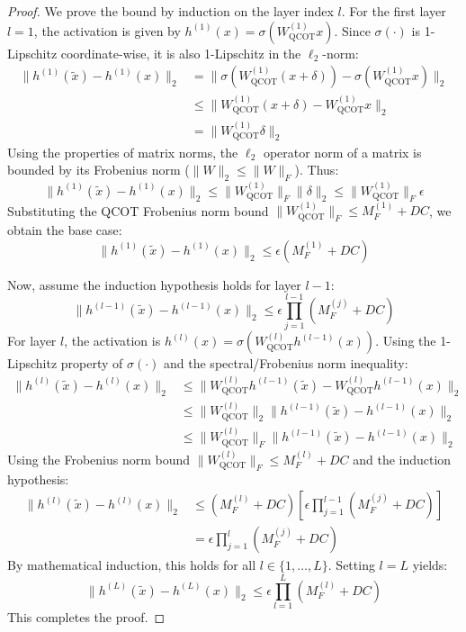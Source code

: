 \documentclass{article}
\theoremstyle{plain}
\theoremstyle{definition}
\theoremstyle{remark}
\begin{document}
\begin{proof}
We prove the bound by induction on the layer index $l$.
For the first layer $l = 1$, the activation is given by $h^{(1)}(x) = \sigma(W_{\text{QCOT}}^{(1)} x)$. Since $\sigma(\cdot)$ is 1-Lipschitz coordinate-wise, it is also 1-Lipschitz in the $\ell_2$-norm:
\begin{align}
    \|h^{(1)}(\tilde{x}) - h^{(1)}(x)\|_2 &= \|\sigma(W_{\text{QCOT}}^{(1)} (x + \delta)) - \sigma(W_{\text{QCOT}}^{(1)} x)\|_2 \nonumber \\
    &\le \|W_{\text{QCOT}}^{(1)} (x + \delta) - W_{\text{QCOT}}^{(1)} x\|_2 \nonumber \\
    &= \|W_{\text{QCOT}}^{(1)} \delta\|_2
\end{align}
Using the properties of matrix norms, the $\ell_2$ operator norm of a matrix is bounded by its Frobenius norm ($\|W\|_2 \le \|W\|_F$). Thus:
\begin{equation}
    \|h^{(1)}(\tilde{x}) - h^{(1)}(x)\|_2 \le \|W_{\text{QCOT}}^{(1)}\|_F \|\delta\|_2 \le \|W_{\text{QCOT}}^{(1)}\|_F \epsilon
\end{equation}
Substituting the QCOT Frobenius norm bound $\|W_{\text{QCOT}}^{(1)}\|_F \le M_F^{(1)} + D C$, we obtain the base case:
\begin{equation}
    \|h^{(1)}(\tilde{x}) - h^{(1)}(x)\|_2 \le \epsilon \left( M_F^{(1)} + D C \right)
\end{equation}

Now, assume the induction hypothesis holds for layer $l-1$:
\begin{equation}
    \|h^{(l-1)}(\tilde{x}) - h^{(l-1)}(x)\|_2 \le \epsilon \prod_{j=1}^{l-1} \left( M_F^{(j)} + D C \right)
\end{equation}
For layer $l$, the activation is $h^{(l)}(x) = \sigma(W_{\text{QCOT}}^{(l)} h^{(l-1)}(x))$. Using the 1-Lipschitz property of $\sigma(\cdot)$ and the spectral/Frobenius norm inequality:
\begin{align}
    \|h^{(l)}(\tilde{x}) - h^{(l)}(x)\|_2 &\le \|W_{\text{QCOT}}^{(l)} h^{(l-1)}(\tilde{x}) - W_{\text{QCOT}}^{(l)} h^{(l-1)}(x)\|_2 \nonumber \\
    &\le \|W_{\text{QCOT}}^{(l)}\|_2 \|h^{(l-1)}(\tilde{x}) - h^{(l-1)}(x)\|_2 \nonumber \\
    &\le \|W_{\text{QCOT}}^{(l)}\|_F \|h^{(l-1)}(\tilde{x}) - h^{(l-1)}(x)\|_2
\end{align}
Using the Frobenius norm bound $\|W_{\text{QCOT}}^{(l)}\|_F \le M_F^{(l)} + D C$ and the induction hypothesis:
\begin{align}
    \|h^{(l)}(\tilde{x}) - h^{(l)}(x)\|_2 &\le \left( M_F^{(l)} + D C \right) \left[ \epsilon \prod_{j=1}^{l-1} \left( M_F^{(j)} + D C \right) \right] \nonumber \\
    &= \epsilon \prod_{j=1}^l \left( M_F^{(j)} + D C \right)
\end{align}
By mathematical induction, this holds for all $l \in \{1, \dots, L\}$. Setting $l = L$ yields:
\begin{equation}
    \|h^{(L)}(\tilde{x}) - h^{(L)}(x)\|_2 \le \epsilon \prod_{l=1}^L \left( M_F^{(l)} + D C \right)
\end{equation}
This completes the proof.
\end{proof}
\end{document}
